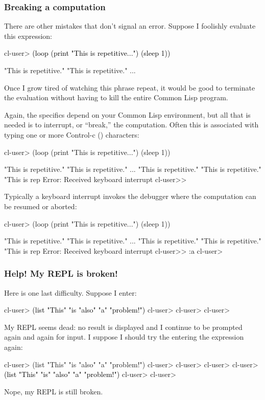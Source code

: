\documentclass[10pt,twoside,english,pdftex]{article}
\begin{document}
\subsubsection*{Breaking a computation}

There are other mistakes that don't signal an error.  Suppose I
foolishly evaluate this expression:
%
\W\supp
\begin{example}
\textcolor{darkergray}{%
  cl-user> \textcolor{black}{(loop (print "This is repetitive...") (sleep 1))}

  "This is repetitive." 
  "This is repetitive." 
       ...}
\end{example}
%
Once I grow tired of watching this phrase repeat, it would be good to
terminate the evaluation without having to kill the entire Common Lisp
program.

Again, the specifics depend on your Common Lisp environment, but all that is
needed is to interrupt, or ``break,'' the computation.  Often this is
associated with typing one or more Control-c () characters:
%
\W\supp
\begin{example}
\textcolor{darkergray}{%
  cl-user> (loop (print "This is repetitive...") (sleep 1))

  "This is repetitive." 
  "This is repetitive." 
       ...
  "This is repetitive." 
  "This is repetitive." 
  "This is rep\textcolor{black}{}
  Error: Received keyboard interrupt 
  cl-user>>}
\end{example}
%
Typically a keyboard interrupt invokes the debugger where the computation
can be resumed or aborted:
%
\W\supp\notpretop
\begin{example}
\textcolor{darkergray}{%
  cl-user> (loop (print "This is repetitive...") (sleep 1))

  "This is repetitive." 
  "This is repetitive." 
       ...
  "This is repetitive." 
  "This is repetitive." 
  "This is rep
  Error: Received keyboard interrupt 
  cl-user>> \textcolor{black}{:a}
  cl-user>}
\end{example}

\subsubsection*{Help! My REPL is broken!}

Here is one last difficulty.  Suppose I enter:
%
\W\supp
\begin{example}
\textcolor{darkergray}{%
  cl-user> \textcolor{black}{(list "This" "is "also" "a" "problem!")}
  cl-user>
  cl-user>
  cl-user>}
\end{example}
%
My REPL seems dead: no result is displayed and I continue to be prompted again
and again for input.  I suppose I should try the entering the expression
again:
%
\W\supp\notpretop
\begin{example}
\textcolor{darkergray}{%
  cl-user> (list "This" "is "also" "a" "problem!")
  cl-user>
  cl-user>
  cl-user>
  cl-user> \textcolor{black}{(list "This" "is" "also" "a" "problem!")}
  cl-user>
  cl-user>}
\end{example}
%
Nope, my REPL is still broken.
\end{document}
